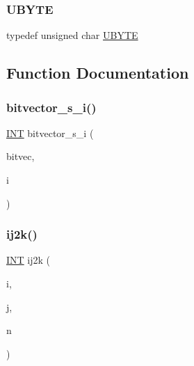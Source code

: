 \mbox{\label{nauty__interface_8_c_a122c4acf389c050379f00341fdcd5812}} 
\subsubsection{\texorpdfstring{U\+B\+Y\+TE}{UBYTE}}
{\footnotesize\ttfamily typedef unsigned char \mbox{\hyperlink{galois_8h_a122c4acf389c050379f00341fdcd5812}{U\+B\+Y\+TE}}}



\subsection{Function Documentation}
\mbox{\label{nauty__interface_8_c_ac0135a3681a44df3fe7af1545676fbe2}} 
\subsubsection{\texorpdfstring{bitvector\+\_\+s\+\_\+i()}{bitvector\_s\_i()}}
{\footnotesize\ttfamily \mbox{\hyperlink{galois_8h_a09fddde158a3a20bd2dcadb609de11dc}{I\+NT}} bitvector\+\_\+s\+\_\+i (\begin{DoxyParamCaption}\item[{\mbox{\hyperlink{galois_8h_a122c4acf389c050379f00341fdcd5812}{U\+B\+Y\+TE}} $\ast$}]{bitvec,  }\item[{\mbox{\hyperlink{galois_8h_a09fddde158a3a20bd2dcadb609de11dc}{I\+NT}}}]{i }\end{DoxyParamCaption})}

\mbox{\label{nauty__interface_8_c_a68a0fe85ad4b80a9220cb33f9c4c0042}} 
\subsubsection{\texorpdfstring{ij2k()}{ij2k()}}
{\footnotesize\ttfamily \mbox{\hyperlink{galois_8h_a09fddde158a3a20bd2dcadb609de11dc}{I\+NT}} ij2k (\begin{DoxyParamCaption}\item[{\mbox{\hyperlink{galois_8h_a09fddde158a3a20bd2dcadb609de11dc}{I\+NT}}}]{i,  }\item[{\mbox{\hyperlink{galois_8h_a09fddde158a3a20bd2dcadb609de11dc}{I\+NT}}}]{j,  }\item[{\mbox{\hyperlink{galois_8h_a09fddde158a3a20bd2dcadb609de11dc}{I\+NT}}}]{n }\end{DoxyParamCaption})}

